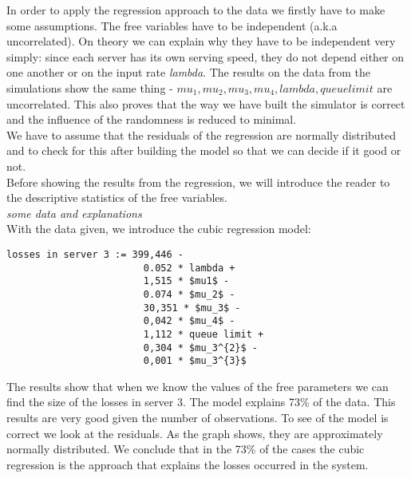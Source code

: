 \documentclass[12pt]{article}
\theoremstyle{plain}
\begin{document}
In order to apply the regression approach to the data we firstly have to make some
assumptions. The free variables have to be independent (a.k.a uncorrelated). On
theory we can explain why they have to be independent very simply: since each
server has its own serving speed, they do not depend either on one another or on
the input rate \emph{lambda}. The results on the data from the simulations show
the same thing - $mu_1, mu_2, mu_3, mu_4, lambda, queue limit$ are uncorrelated.
This also proves that the way we have built the simulator is correct and the
influence of the randomness is reduced to minimal.\\
We have to assume that the residuals of the regression are normally distributed
and to check for this after building the model so that we can decide if it good
or not.\\
Before showing the results from the regression, we will introduce the reader to
the descriptive statistics of the free variables.\\
\emph{some data and explanations}\\
With the data given, we introduce the cubic regression model:\\

\begin{lstlisting}[frame=single]
  losses in server 3 := 399,446 -
                        0.052 * lambda +
                        1,515 * $mu1$ -
                        0.074 * $mu_2$ -
                        30,351 * $mu_3$ -
                        0,042 * $mu_4$ -
                        1,112 * queue limit +
                        0,304 * $mu_3^{2}$ -
                        0,001 * $mu_3^{3}$
\end{lstlisting}

The results show that when we know the values of the free parameters we can find
the size of the losses in server 3. The model explains 73\% of the data. This
results are very good given the number of observations. To see of the model is
correct we look at the residuals. As the graph shows, they are approximately
normally distributed. We conclude that in the 73\% of the cases the cubic regression
is the approach that explains the losses occurred in the system.
\end{document}
